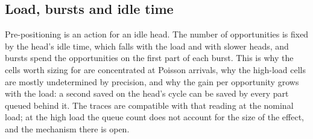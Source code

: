 \documentclass[11pt,a4paper]{article}
\begin{document}
\subsection{Load, bursts and idle time}
Pre-positioning is an action for an idle head. The number of opportunities is fixed by
the head's idle time, which falls with the load and with slower heads, and bursts spend
the opportunities on the first part of each burst. This is why the cells worth sizing for
are concentrated at Poisson arrivals, why the high-load cells are mostly undetermined by
precision, and why the gain per opportunity grows with the load: a second saved on the
head's cycle can be saved by every part queued behind it. The traces are compatible with
that reading at the nominal load; at the high load the queue count does not account for
the size of the effect, and the mechanism there is open.
\end{document}
